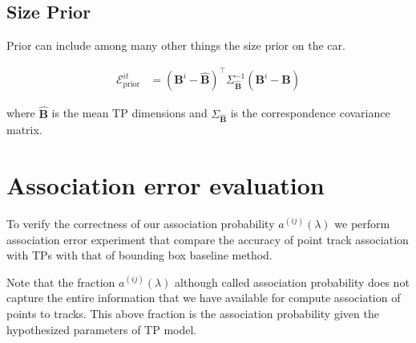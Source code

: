 \documentclass[10pt,twocolumn,letterpaper]{article}
\newcommand{\relp}[2]{\Omega^{#1}(#2)}
\newcommand{\trackpj}[1]{\mathbf{u}_j(#1)}
\newcommand{\dimsn}[1]{\mathbf{B}^{#1}}
\newcommand{\expDimsn}{\hat{\mathbf{B}}}
\newcommand{\projectionOf}[1]{\pi_{\relp{i}{t}}\left(#1\right)}
\newcommand{\Energy}[1]{\mathcal{E}^{it}_{\text{#1}}}
\newcommand{\invProjectionOf}[1]{\pi^{-1}_{\relp{i}{t}}\left(#1\right)}
\newcommand{\occf}{f^i_{occ}(\mathbf{x}_j)}
\newcommand{\ray}{\hat{\mathbf{r}}_j}
\newcommand{\lambdadist}{f_{\lambda}(\trackpj{t-1}, \lambda)}
\newcommand{\assocP}{a^{(ij)}(\lambda)}
\begin{document}
\subsection{Size Prior}

Prior can include among many other things the size prior on the car.

\begin{align}
  \label{eq:totalSizeEnergy}
  \Energy{prior} &= (\dimsn{i} - \expDimsn)^\top\Sigma_{\expDimsn}^{-1}(\dimsn{i} -
  \expDimsn)
\end{align}

where $\expDimsn$ is the mean TP dimensions and
$\Sigma_{\expDimsn}$ is the correspondence covariance matrix.

\section{Association error evaluation}

To verify the correctness of our association probability $\assocP$ we perform
association error experiment that compare the accuracy of point track
association with TPs with that of bounding box baseline method.

% 

Note that the fraction $\assocP$ although called association probability does
not capture the entire information that we have available for compute
association of points to tracks. This above fraction is the association
probability given the hypothesized parameters of TP model. 
\end{document}
